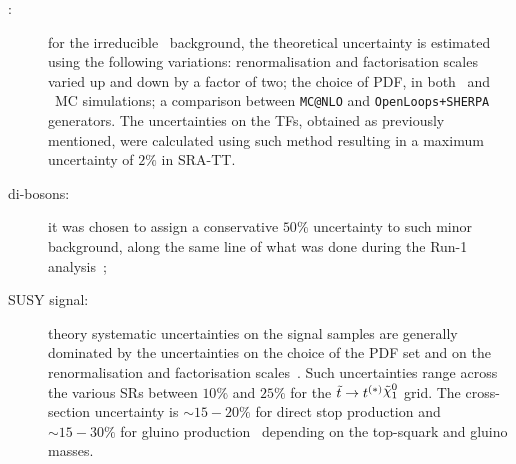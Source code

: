 \begin{description}
				\item [\boldmath \ttV :] for the irreducible \ttV\ background, the theoretical uncertainty is estimated using the following variations: renormalisation and factorisation scales varied up and down by a factor of two; the choice of \ac{PDF}, in both \ttV\ and \ttgamma\ \ac{MC} simulations; a comparison between \texttt{MC@NLO} and \texttt{OpenLoops+SHERPA} generators. The uncertainties on the \acp{TF}, obtained as previously mentioned, were calculated using such method resulting in a maximum uncertainty of $2\%$ in SRA-TT.

				\item [di-bosons:] it was chosen to assign a conservative $50\%$ uncertainty to such minor background, along the same line of what was done during the Run-1 analysis~\cite{stop0LRun1};

				\item [SUSY signal:] theory systematic uncertainties on the signal samples are generally dominated by the uncertainties on the choice of the \ac{PDF} set and on the renormalisation and factorisation scales~\cite{Beenakker2011}. Such uncertainties range across the various \acp{SR} between $10\%$ and $25\%$ for the $\stop\to t^{(*)} \ninoone$ grid. %
				The cross-section uncertainty is $\sim15-20\%$ for direct stop production and $\sim15-30\%$ for gluino production~\cite{Beenakker:1997ut,Beenakker:2010nq,Beenakker:2011fu,Borschensky:2014cia} depending on the top-squark and gluino masses.
			\end{description}
